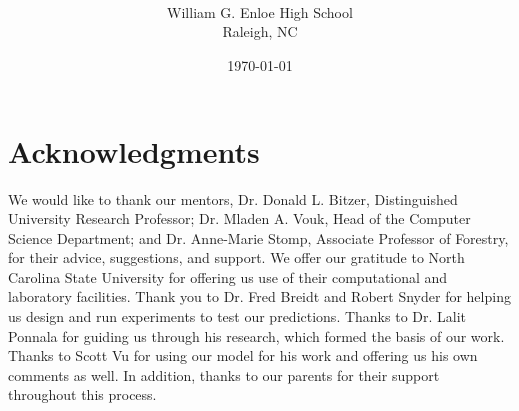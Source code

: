 \documentclass[11pt]{article}
\author{\sc{\BWFauthors}\\
William G. Enloe High School\\
Raleigh, NC}
\date{{\sc \today}}
\title{\bf{\BWFtitle{\emph}{ }}}
\begin{document}
\maketitle

\newpage
\section*{Acknowledgments}
We would like to thank our mentors, Dr. Donald L. Bitzer,
Distinguished University Research Professor; Dr. Mladen A. 
Vouk, Head of the Computer Science Department; and Dr. Anne-Marie
Stomp, Associate Professor of Forestry, for their advice, suggestions,
and support.  We offer our gratitude to North Carolina State University
for offering us use of their computational and laboratory facilities.  
Thank you to Dr. Fred Breidt and Robert Snyder for helping us design
and run experiments to test our predictions.  Thanks to Dr. Lalit
Ponnala for guiding us through his research, which formed the basis
of our work.  Thanks to Scott Vu for using our model for his work and offering
us his own comments as well.  In addition, thanks to our parents for their
support throughout this process.


\newpage
\begin{onehalfspace}
\tableofcontents
\end{onehalfspace}
\newpage
\end{document}
